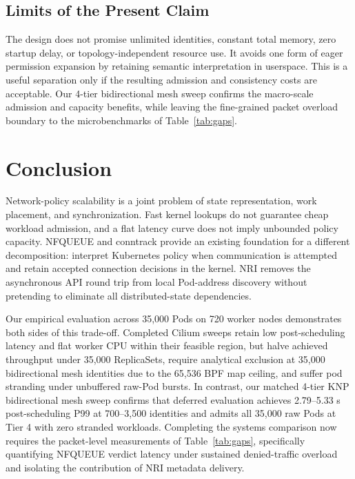 \documentclass[letterpaper,twocolumn,10pt]{article}
\newcommand{\sys}{\textsc{KNP}}
\begin{document}
\subsection{Limits of the Present Claim}
The design does not promise unlimited identities, constant total
memory, zero startup delay, or topology-independent resource use.
It avoids one form of eager permission expansion by retaining
semantic interpretation in userspace. This is a useful separation
only if the resulting admission and consistency costs are acceptable.
Our 4-tier bidirectional mesh sweep confirms the macro-scale
admission and capacity benefits, while leaving the fine-grained packet
overload boundary to the microbenchmarks of Table~\ref{tab:gaps}.

\section{Conclusion}
Network-policy scalability is a joint problem of state representation,
work placement, and synchronization. Fast kernel lookups do not
guarantee cheap workload admission, and a flat latency curve does
not imply unbounded policy capacity. NFQUEUE and conntrack provide
an existing foundation for a different decomposition: interpret
Kubernetes policy when communication is attempted and retain accepted
connection decisions in the kernel. NRI removes the asynchronous
API round trip from local Pod-address discovery without pretending
to eliminate all distributed-state dependencies.

Our empirical evaluation across 35,000 Pods on 720 worker nodes
demonstrates both sides of this trade-off. Completed Cilium sweeps
retain low post-scheduling latency and flat worker CPU within their
feasible region, but halve achieved throughput under 35,000 ReplicaSets,
require analytical exclusion at 35,000 bidirectional mesh identities
due to the 65,536 BPF map ceiling, and suffer pod stranding under
unbuffered raw-Pod bursts. In contrast, our matched 4-tier \sys{}
bidirectional mesh sweep confirms that deferred evaluation achieves
2.79--5.33 s post-scheduling P99 at 700--3,500 identities and admits
all 35,000 raw Pods at Tier 4 with zero stranded workloads. Completing
the systems comparison now requires the packet-level measurements of
Table~\ref{tab:gaps}, specifically quantifying NFQUEUE verdict latency
under sustained denied-traffic overload and isolating the contribution
of NRI metadata delivery.

\clearpage


\end{document}
